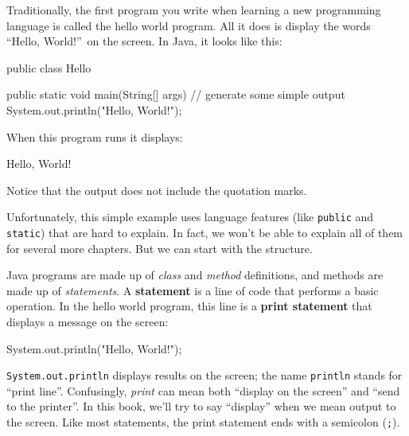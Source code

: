 \documentclass[12pt]{book}
\theoremstyle{exercise}
\newcommand{\java}[1]{\verb"#1"}
\begin{document}

Traditionally, the first program you write when learning a new programming language is called the hello world program.
All it does is display the words ``Hello, World!''\ on the screen.
In Java, it looks like this:


\begin{code}
public class Hello {

    public static void main(String[] args) {
        // generate some simple output
        System.out.println("Hello, World!");
    }
}
\end{code}

When this program runs it displays:

\begin{stdout}
Hello, World!
\end{stdout}

Notice that the output does not include the quotation marks.


Unfortunately, this simple example uses language features (like \java{public} and \java{static}) that are hard to explain.
In fact, we won't be able to explain all of them for several more chapters.
But we can start with the structure.


Java programs are made up of {\em class} and {\em method} definitions, and methods are made up of {\em statements}.
A {\bf statement} is a line of code that performs a basic operation.
In the hello world program, this line is a {\bf print statement} that displays a message on the screen:

\begin{code}
    System.out.println("Hello, World!");
\end{code}


\java{System.out.println} displays results on the screen; the name \java{println} stands for ``print line''.
Confusingly, {\em print} can mean both ``display on the screen'' and ``send to the printer''.
In this book, we'll try to say ``display'' when we mean output to the screen.
Like most statements, the print statement ends with a semicolon (\java{;}).
\end{document}

